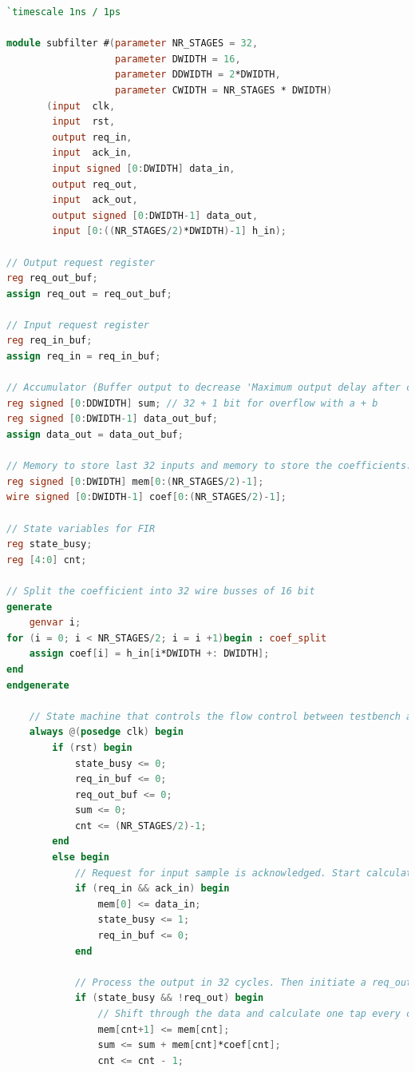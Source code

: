 \documentclass[a4paper,twoside,11pt, fleqn]{article}
\begin{document}
\begin{lstlisting}[language=Verilog]
`timescale 1ns / 1ps

module subfilter #(parameter NR_STAGES = 32,
                   parameter DWIDTH = 16,
                   parameter DDWIDTH = 2*DWIDTH,
                   parameter CWIDTH = NR_STAGES * DWIDTH)
       (input  clk,
        input  rst,
        output req_in,
        input  ack_in,
        input signed [0:DWIDTH] data_in,
        output req_out,
        input  ack_out,
        output signed [0:DWIDTH-1] data_out,
        input [0:((NR_STAGES/2)*DWIDTH)-1] h_in);

// Output request register
reg req_out_buf;
assign req_out = req_out_buf;

// Input request register
reg req_in_buf;
assign req_in = req_in_buf;

// Accumulator (Buffer output to decrease 'Maximum output delay after clock')
reg signed [0:DDWIDTH] sum; // 32 + 1 bit for overflow with a + b
reg signed [0:DWIDTH-1] data_out_buf;
assign data_out = data_out_buf;

// Memory to store last 32 inputs and memory to store the coefficients.
reg signed [0:DWIDTH] mem[0:(NR_STAGES/2)-1];
wire signed [0:DWIDTH-1] coef[0:(NR_STAGES/2)-1];

// State variables for FIR
reg state_busy;
reg [4:0] cnt;

// Split the coefficient into 32 wire busses of 16 bit
generate
    genvar i;
for (i = 0; i < NR_STAGES/2; i = i +1)begin : coef_split
    assign coef[i] = h_in[i*DWIDTH +: DWIDTH];
end
endgenerate

    // State machine that controls the flow control between testbench and filter
    always @(posedge clk) begin
        if (rst) begin
            state_busy <= 0;
            req_in_buf <= 0;
            req_out_buf <= 0;
            sum <= 0;
            cnt <= (NR_STAGES/2)-1;
        end
        else begin
            // Request for input sample is acknowledged. Start calculating
            if (req_in && ack_in) begin
                mem[0] <= data_in;
                state_busy <= 1;
                req_in_buf <= 0;
            end

            // Process the output in 32 cycles. Then initiate a req_out to warn the output that a sample is ready
            if (state_busy && !req_out) begin
                // Shift through the data and calculate one tap every clock cycle
                mem[cnt+1] <= mem[cnt];
                sum <= sum + mem[cnt]*coef[cnt];
                cnt <= cnt - 1;


\end{lstlisting}
\end{document}
